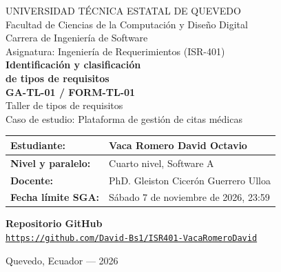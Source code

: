 \documentclass[11pt,a4paper]{article}
\begin{document}
\begin{center}
{\large UNIVERSIDAD T\'ECNICA ESTATAL DE QUEVEDO}\\[6pt]
{\normalsize Facultad de Ciencias de la Computaci\'on y Dise\~no Digital}\\[3pt]
{\normalsize Carrera de Ingenier\'ia de Software}\\[14pt]
{\normalsize Asignatura: Ingenier\'ia de Requerimientos (ISR-401)}\\[42pt]
{\LARGE\bfseries Identificaci\'on y clasificaci\'on\\[4pt] de tipos de requisitos}\\[14pt]
{\large\bfseries GA-TL-01 / FORM-TL-01}\\[14pt]
{\normalsize Taller de tipos de requisitos}\\[8pt]
{\normalsize Caso de estudio: Plataforma de gesti\'on de citas m\'edicas}
\end{center}
\vspace{1.4cm}
\begin{tabularx}{\textwidth}{|>{\bfseries}p{4.5cm}|X|}\hline
Estudiante: & Vaca Romero David Octavio \\ \hline
Nivel y paralelo: & Cuarto nivel, Software A \\ \hline
Docente: & PhD. Gleiston Cicer\'on Guerrero Ulloa \\ \hline
Fecha l\'imite SGA: & S\'abado 7 de noviembre de 2026, 23:59 \\ \hline
\end{tabularx}
\vspace{1.3cm}
\begin{center}
{\bfseries Repositorio GitHub}\\[12pt]
\mbox{\href{https://github.com/David-Bs1/ISR401-VacaRomeroDavid}{\small\texttt{https://github.com/David-Bs1/ISR401-VacaRomeroDavid}}}
\end{center}
\vfill
\begin{center}
Quevedo, Ecuador --- 2026
\end{center}
\end{document}
